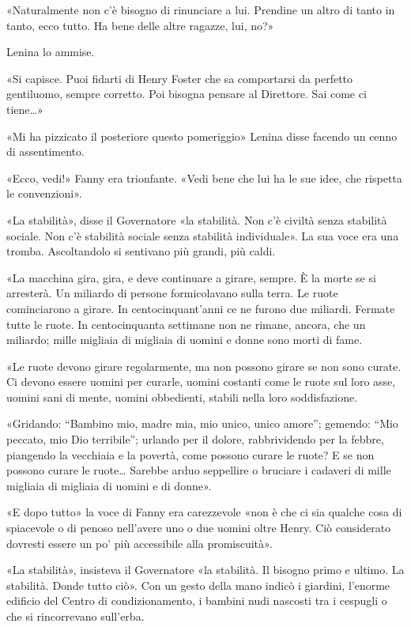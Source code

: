 \documentclass[
a5paper, %
10pt, %
twoside, 
onecolumn, %
openany, %
]{memoir}
\renewenvironment{shaded}{%
  \def\FrameCommand{\fboxsep=\FrameSep \colorbox{shadecolor}}%
  \MakeFramed{\advance\hsize-\width \FrameRestore\FrameRestore}}%
 {\endMakeFramed}
\begin{document}
\begin{shaded}
    «Naturalmente non c’è bisogno di rinunciare a lui. Prendine un altro di tanto in tanto, ecco tutto. Ha bene delle altre ragazze, lui, no?»

Lenina lo ammise.

«Si capisce. Puoi fidarti di Henry Foster che sa comportarsi da perfetto gentiluomo, sempre corretto. Poi bisogna pensare al Direttore. Sai come ci tiene…»

«Mi ha pizzicato il posteriore questo pomeriggio» Lenina disse facendo un cenno di assentimento.

«Ecco, vedi!» Fanny era trionfante. «Vedi bene che lui ha le sue idee, che rispetta le convenzioni».
\end{shaded}

«La stabilità», disse il Governatore «la stabilità. Non c’è civiltà senza stabilità sociale. Non c’è stabilità sociale senza stabilità individuale». La sua voce era una tromba. Ascoltandolo si sentivano più grandi, più caldi.

«La macchina gira, gira, e deve continuare a girare, sempre. È la morte se si arresterà. Un miliardo di persone formicolavano sulla terra. Le ruote cominciarono a girare. In centocinquant’anni ce ne furono due miliardi. Fermate tutte le ruote. In centocinquanta settimane non ne rimane, ancora, che un miliardo; mille migliaia di migliaia di uomini e donne sono morti di fame.

«Le ruote devono girare regolarmente, ma non possono girare se non sono curate. Ci devono essere uomini per curarle, uomini costanti come le ruote sul loro asse, uomini sani di mente, uomini obbedienti, stabili nella loro soddisfazione.

«Gridando: “Bambino mio, madre mia, mio unico, unico amore”; gemendo: “Mio peccato, mio Dio terribile”; urlando per il dolore, rabbrividendo per la febbre, piangendo la vecchiaia e la povertà, come possono curare le ruote? E se non possono curare le ruote… Sarebbe arduo seppellire o bruciare i cadaveri di mille migliaia di migliaia di uomini e di donne».

\begin{shaded}
    «E dopo tutto» la voce di Fanny era carezzevole «non è che ci sia qualche cosa di spiacevole o di penoso nell’avere uno o due uomini oltre Henry. Ciò considerato dovresti essere un po’ più accessibile alla promiscuità».
\end{shaded}

«La stabilità», insisteva il Governatore «la stabilità. Il bisogno primo e ultimo. La stabilità. Donde tutto ciò». Con un gesto della mano indicò i giardini, l’enorme edificio del Centro di condizionamento, i bambini nudi nascosti tra i cespugli o che si rincorrevano sull’erba.
\end{document}
